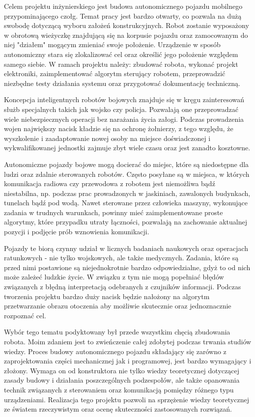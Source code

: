 Celem projektu inżynierskiego jest budowa autonomicznego pojazdu mobilnego przypominającego czołg. Temat pracy jest bardzo otwarty, co pozwala na dużą swobodę dotyczącą wyboru założeń konstrukcyjnych. Robot zostanie wyposażony w obrotową wieżyczkę znajdującą się na korpusie pojazdu oraz zamocowanym do niej "działem" mogącym zmieniać swoje położenie. Urządzenie w sposób autonomiczny stara się zlokalizować cel oraz określić jego położenie względem samego siebie. W ramach projektu należy: zbudować robota, wykonać projekt elektroniki, zaimplementować algorytm sterujący robotem, przeprowadzić niezbędne testy działania systemu oraz przygotować dokumentację techniczną.

Koncepcja inteligentnych robotów bojowych znajduje się w kręgu zainteresowań służb specjalnych takich jak wojsko czy policja. Pozwalają one przeprowadzać wiele niebezpiecznych operacji bez narażania życia załogi. Podczas prowadzenia wojen największy nacisk kładzie się na ochronę żołnierzy, z tego względu, że wyszkolenie i zaadaptowanie nowej osoby na miejsce doświadczonej i wykwalifikowanej jednostki zajmuje zbyt wiele czasu oraz jest zanadto kosztowne. 

Autonomiczne pojazdy bojowe mogą docierać do miejsc, które są niedostępne dla ludzi oraz zdalnie sterowanych robotów. Często posyłane są w miejsca, w których komunikacja radiowa czy przewodowa z robotem jest niemożliwa bądź niestabilna, np. podczas prac prowadzonych w jaskiniach, zawalonych budynkach, tunelach bądź pod wodą. Nawet sterowane przez człowieka maszyny, wykonujące zadania w trudnych warunkach, powinny mieć zaimplementowane proste algorytmy, które przypadku utraty łączności, pozwalają na zachowanie aktualnej pozycji i podjęcie prób wznowienia komunikacji.

Pojazdy te biorą czynny udział w licznych badaniach naukowych oraz operacjach ratunkowych - nie tylko wojskowych, ale także medycznych. Zadania, które są przed nimi postawione są niejednokrotnie bardzo odpowiedzialne, gdyż to od nich może zależeć ludzkie życie. W związku z tym nie mogą popełniać błędów związanych z błędną interpretacją odebranych z czujników informacji. Podczas tworzenia projektu bardzo duży nacisk będzie nałożony na algorytm przetwarzanie obrazu otoczenia aby możliwie skutecznie oraz jednoznacznie rozpoznać cel.

Wybór tego tematu podyktowany był przede wszystkim chęcią zbudowania robota. Moim zdaniem jest to zwieńczenie całej zdobytej podczas trwania studiów wiedzy. Proces budowy autonomicznego pojazdu składający się zarówno z zaprojektowania części mechanicznej jak i programowej, jest bardzo wymagający i złożony. Wymaga on od konstruktora nie tylko wiedzy teoretycznej dotyczącej zasady budowy i działania poszczególnych podzespołów, ale także opanowania technik związanych z sterowaniem oraz komunikacją pomiędzy różnego typu urządzeniami. Realizacja tego projektu pozwoli na sprzężenie wiedzy teoretycznej ze światem rzeczywistym oraz ocenę skuteczności zastosowanych rozwiązań.

